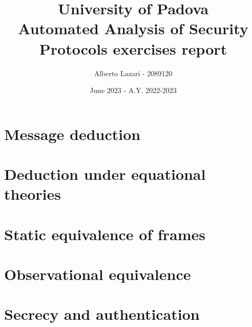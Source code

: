 \documentclass[12pt]{article}
\title{\textbf{University of Padova \\ Automated Analysis of Security Protocols exercises report}}
\author{Alberto Lazari - 2089120}
\date{June 2023 - A.Y. 2022-2023}
\begin{document}
    \maketitle
    \pagebreak

    \tableofcontents
    \pagebreak

    \section{Message deduction}
    

    \section{Deduction under equational theories}
    

    \section{Static equivalence of frames}
    

    \section{Observational equivalence}
    

    \section{Secrecy and authentication}
    
\end{document}
